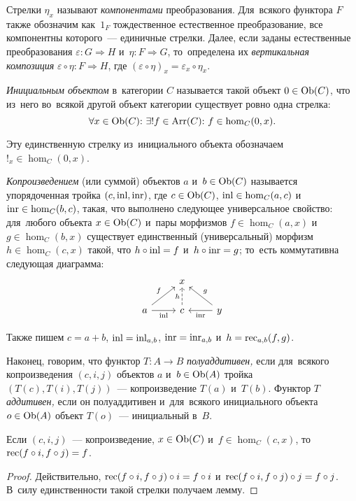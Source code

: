 \documentclass{article}
\begin{document}
Стрелки $\eta_x$ называют \textit{компонентами} преобразования. Для~всякого функтора $F$ также
обозначим как~$1_F$ тождественное естественное преобразование, все компонентны которого~— единичные стрелки.
Далее, если заданы естественные преобразования $\varepsilon : G \Rightarrow H$ и~$\eta : F \Rightarrow G$,
то~определена их \textit{вертикальная композиция} $\varepsilon \circ \eta : F \Rightarrow H$,
где $(\varepsilon \circ \eta)_x = \varepsilon_x \circ \eta_x$.

\textit{Инициальным объектом} в~категории $C$ называется такой объект $0 \in \mathrm{Ob}(C)$,
что из~него во~всякой другой объект категории существует ровно одна стрелка:
$$
  \forall x \in \mathrm{Ob}(C){:}\ \exists! f \in \mathrm{Arr}(C){:}\ f \in \hom_C(0, x).
$$

Эту единственную стрелку из~инициального объекта обозначаем $!_x \in \hom_C(0, x)$.

\textit{Копроизведением} (или суммой) объектов $a$ и~$b \in \mathrm{Ob}(C)$ называется упорядоченная тройка $(c, \mathrm{inl}, \mathrm{inr})$,
где $c \in \mathrm{Ob}(C)$, $\mathrm{inl} \in \hom_C(a, c)$ и~$\mathrm{inr} \in \hom_C(b, c)$, такая, что
выполнено следующее универсальное свойство: для~любого объекта $x \in \mathrm{Ob}(C)$ и~пары морфизмов $f \in \hom_C(a, x)$
и~$g \in \hom_C(b, x)$ существует единственный (универсальный) морфизм $h \in \hom_C(c, x)$ такой, что $h \circ \mathrm{inl} = f$
и~$h \circ \mathrm{inr} = g$; то~есть коммутативна следующая диаграмма:
\[
    \begin{tikzcd}
        & x & \\ a \arrow{r}{}[swap]{\inl} \arrow{ur}{f} & \arrow[dashed]{u}{h} c & \arrow{l}{\inr}[swap]{} \arrow{ul}{}[swap]{g} y
    \end{tikzcd}
\]

Также пишем $c = a + b$, $\mathrm{inl} = \mathrm{inl}_{a, b}$, $\mathrm{inr} = \mathrm{inr}_{a, b}$
и~$h = \mathrm{rec}_{a, b}(f, g)$.

Наконец, говорим, что функтор $T : A \rightarrow B$ \textit{полуаддитивен,} если для~всякого копроизведения $(c, i, j)$ объектов $a$ и~$b \in \mathrm{Ob}(A)$
тройка $(T(c), T(i), T(j))$~— копроизведение $T(a)$ и~$T(b)$. Функтор $T$ \textit{аддитивен,} если он полуаддитивен и~для~всякого инициального объекта
$o \in \mathrm{Ob}(A)$ объект $T(o)$~— инициальный в~$B$.

\begin{lemma*}
    Если $(c, i, j)$~— копроизведение, $x \in \mathrm{Ob}(C)$ и~$f \in \hom_C(c, x)$,
    то~$\mathrm{rec}(f \circ i, f \circ j) = f$.
\end{lemma*}

\begin{proof}
    Действительно, $\mathrm{rec}(f \circ i, f \circ j) \circ i = f \circ i$
    и~$\mathrm{rec}(f \circ i, f \circ j) \circ j = f \circ j$.
    В~силу единственности такой стрелки получаем лемму.
\end{proof}
\end{document}
